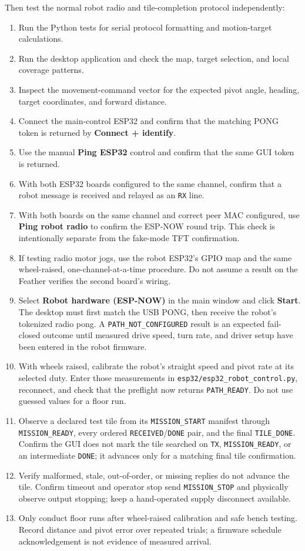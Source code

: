 \documentclass{article}
\begin{document}
Then test the normal robot radio and tile-completion protocol independently:
\begin{enumerate}
    \item Run the Python tests for serial protocol formatting and motion-target calculations.
    \item Run the desktop application and check the map, target selection, and local coverage patterns.
    \item Inspect the movement-command vector for the expected pivot angle, heading, target coordinates, and forward distance.
    \item Connect the main-control ESP32 and confirm that the matching PONG token is returned by \textbf{Connect + identify}.
    \item Use the manual \textbf{Ping ESP32} control and confirm that the same GUI token is returned.
    \item With both ESP32 boards configured to the same channel, confirm that a robot message is received and relayed as an \texttt{RX} line.
    \item With both boards on the same channel and correct peer MAC configured, use \textbf{Ping robot radio} to confirm the ESP-NOW round trip. This check is intentionally separate from the fake-mode TFT confirmation.
    \item If testing radio motor jogs, use the robot ESP32's GPIO map and the same wheel-raised, one-channel-at-a-time procedure. Do not assume a result on the Feather verifies the second board's wiring.
    \item Select \textbf{Robot hardware (ESP-NOW)} in the main window and click \textbf{Start}. The desktop must first match the USB PONG, then receive the robot's tokenized radio pong. A \texttt{PATH\_NOT\_CONFIGURED} result is an expected fail-closed outcome until measured drive speed, turn rate, and driver setup have been entered in the robot firmware.
    \item With wheels raised, calibrate the robot's straight speed and pivot rate at its selected duty. Enter those measurements in \texttt{esp32/esp32\_robot\_control.py}, reconnect, and check that the preflight now returns \texttt{PATH\_READY}. Do not use guessed values for a floor run.
    \item Observe a declared test tile from its \texttt{MISSION\_START} manifest through \texttt{MISSION\_READY}, every ordered \texttt{RECEIVED}/\texttt{DONE} pair, and the final \texttt{TILE\_DONE}. Confirm the GUI does not mark the tile searched on \texttt{TX}, \texttt{MISSION\_READY}, or an intermediate \texttt{DONE}; it advances only for a matching final tile confirmation.
    \item Verify malformed, stale, out-of-order, or missing replies do not advance the tile. Confirm timeout and operator stop send \texttt{MISSION\_STOP} and physically observe output stopping; keep a hand-operated supply disconnect available.
    \item Only conduct floor runs after wheel-raised calibration and safe bench testing. Record distance and pivot error over repeated trials; a firmware schedule acknowledgement is not evidence of measured arrival.
\end{enumerate}
\end{document}
